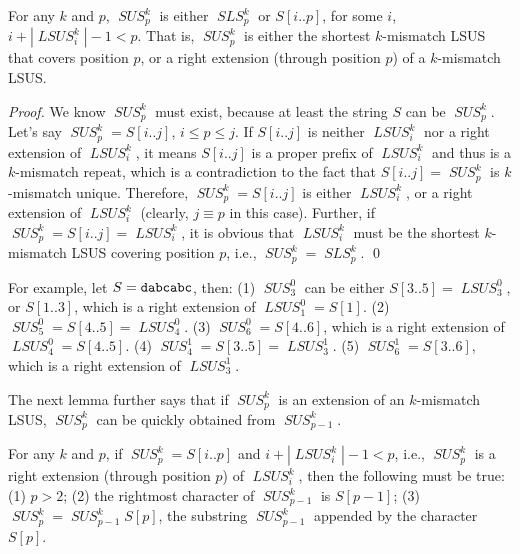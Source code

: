 \documentclass[11pt]{llncs}
\DeclareMathOperator{\sus}{\mathit{SUS}}
\DeclareMathOperator{\lsus}{\mathit{LSUS}}
\DeclareMathOperator{\sls}{\mathit{SLS}}
\begin{document}
\begin{lemma}
\label{lem:ext}
  For any $k$ and $p$, $\sus_p^k$ is either $\sls_p^k$
  or $S[i..p]$, for some $i$,
  $i+|\lsus_i^k|-1<p$. That is, $\sus_p^k$ is either the shortest $k$-mismatch
  LSUS that covers position $p$, or a right extension (through
  position $p$) of a $k$-mismatch LSUS. 
\end{lemma}



\begin{proof}
  We know $\sus_p^k$ must exist, because at least the string $S$ can
  be $\sus_p^k$. Let's say $\sus_p^k = S[i..j]$, $i\leq p \leq j$. 
  If $S[i.. j]$ is neither
  $\lsus_i^k$ nor a right extension of $\lsus_i^k$, it means
  $S[i.. j]$ is a proper prefix of $\lsus_i^k$ and thus is a
  $k$-mismatch repeat, which is a contradiction to the fact that
  $S[i.. j] = \sus_p^k$ is $k$-mismatch unique. Therefore,
  $\sus_p^k=S[i..j]$ is either $\lsus_i^k$, or a right extension of 
  $\lsus_i^k$ (clearly, $j\equiv p$ in this case).
  Further, if $\sus_p^k=S[i..j]=\lsus_i^k$, it is obvious that
  $\lsus_i^k$ must be the shortest
  $k$-mismatch LSUS covering position $p$, i.e., $\sus_p^k = \sls_p^k$.
 \qed
\end{proof}

For example, let $S={\tt dabcabc}$, then:
(1) $\sus_3^0$ can be either  $S[3..5]=\lsus_3^0$, 
or $S[1..3]$, which is a right
extension of $\lsus_1^0=S[1]$.
(2) $\sus_5^0 = S[4..5]=\lsus_4^0$.
(3) $\sus_6^0 = S[4..6]$, which is a right extension 
of $\lsus_4^0 = S[4..5]$.
(4) $\sus_4^1 = S[3..5] = \lsus_3^1$. 
(5) $\sus_6^1 = S[3..6]$, which is a right extension 
of  $\lsus_3^1$. 

\bigskip 

The next lemma further says that if $\sus_p^k$ is an
extension of an $k$-mismatch LSUS, $\sus_p^k$ can be quickly obtained
from $\sus_{p-1}^k$.

\begin{lemma}
\label{lem:ext2}
  For any $k$ and $p$, if $\sus_p^k = S[i..p]$ and  $i+|\lsus_i^k|-1 < p$, i.e., $\sus_p^k$ is a right extension
  (through position $p$) 
of
  $\lsus_i^k$, then the following must be true: (1) $p>2$; (2) the
  rightmost character of $\sus_{p-1}^k$ is $S[p-1]$; (3)
  $\sus_p^k = \sus_{p-1}^kS[p]$, the substring $\sus_{p-1}^k$
   appended by the character $S[p]$.
\end{lemma}
\end{document}
